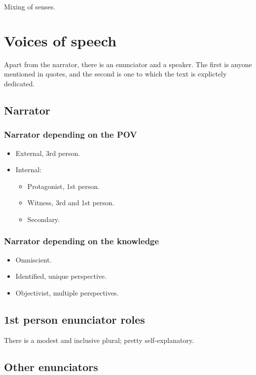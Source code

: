 \documentclass{article}
\begin{document}
Mixing of senses.

\section*{Voices of speech}

Apart from the narrator, there is an enunciator and a speaker.
The first is anyone mentioned in quotes, and the second is one to which the text
is explictely dedicated.

\subsection*{Narrator}

\subsubsection*{Narrator depending on the POV}

\begin{itemize}
    \item External, 3rd person.
    \item Internal:
    \begin{itemize}
        \item Protagonist, 1st person.
        \item Witness, 3rd and 1st person.
        \item Secondary.
    \end{itemize}
\end{itemize}

\subsubsection*{Narrator depending on the knowledge}

\begin{itemize}
    \item Omniscient.
    \item Identified, unique perspective.
    \item Objectivist, multiple perspectives.
\end{itemize}

\subsection*{1st person enunciator roles}

There is a modest and inclusive plural; pretty self-explanatory.

\subsection*{Other enunciators}
\end{document}
